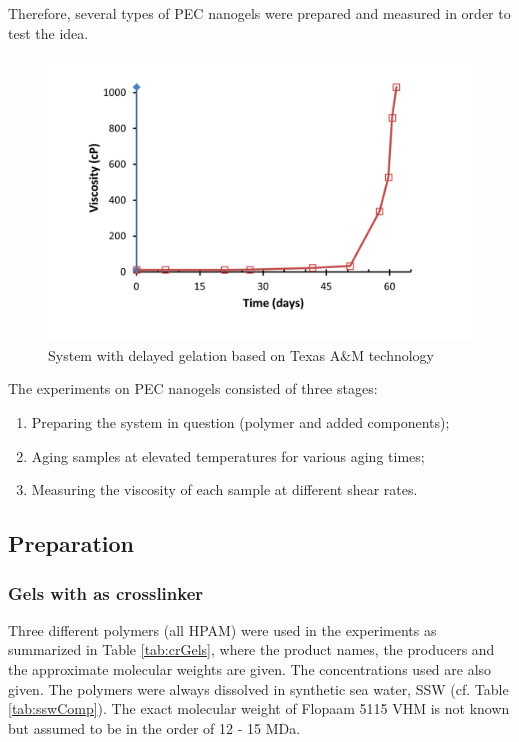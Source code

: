 Therefore, several types of PEC nanogels were prepared and measured in order to test the idea.

\begin{figure}
    \centering
    \includegraphics[width=.75\textwidth]{img/cht/jennTai.png}
    \caption{System with delayed gelation based on Texas A\&M technology \citep{Cordova2008}}
    \label{cht:jennTai}
\end{figure}

\newpage
The experiments on PEC nanogels consisted of three stages:
\begin{enumerate}
    \item Preparing the system in question (polymer and added components);
    \item Aging samples at elevated temperatures for various aging times;
    \item Measuring the viscosity of each sample at different shear rates.
\end{enumerate}

\subsection{Preparation}

\subsubsection{Gels with  as crosslinker}
Three different polymers (all HPAM) were used in the experiments as summarized in Table \ref{tab:crGels}, where the product names, the producers and the approximate molecular weights are given. The concentrations used are also given. The polymers were always dissolved in synthetic sea water, SSW (cf. Table \ref{tab:sswComp}). The exact molecular weight of Flopaam 5115 VHM is not known but assumed to be in the order of 12 - 15 MDa.

